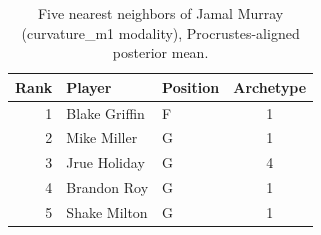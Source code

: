 \begin{table}[htbp]
  \centering\small
  \begin{tabular}{rllc}
    \toprule
    Rank & Player & Position & Archetype \\
    \midrule
    1 & Blake Griffin & F & 1 \\
    2 & Mike Miller & G & 1 \\
    3 & Jrue Holiday & G & 4 \\
    4 & Brandon Roy & G & 1 \\
    5 & Shake Milton & G & 1 \\
    \bottomrule
  \end{tabular}
  \caption{Five nearest neighbors of Jamal Murray (curvature_m1 modality), Procrustes-aligned posterior mean.}
  \label{tab:Jamal_Murray_neighbors_curvature_m1}
\end{table}

